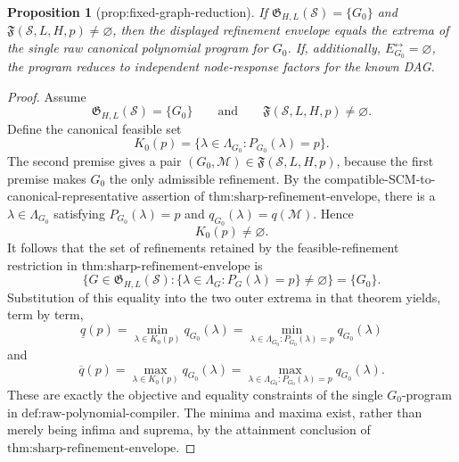 \documentclass{article}
\newtheorem{proposition}{Proposition}
\begin{document}
\begin{proposition}[prop:fixed-graph-reduction]\label{prop:fixed-graph-reduction}
If \(\mathfrak G_{H,L}(\mathcal S)=\{G_0\}\) and \(\mathfrak F(\mathcal S,L,H,p)\ne\varnothing\), then the displayed refinement envelope equals the extrema of the single raw canonical polynomial program for \(G_0\). If, additionally, \(E_{G_0}^{\leftrightarrow}=\varnothing\), the program reduces to independent node-response factors for the known DAG.
\end{proposition}
\begin{proof}
Assume
\[
\mathfrak G_{H,L}(\mathcal S)=\{G_0\}
\qquad\text{and}\qquad
\mathfrak F(\mathcal S,L,H,p)\ne\varnothing.
\]
Define the canonical feasible set
\[
K_0(p)=\{\lambda\in\Lambda_{G_0}:P_{G_0}(\lambda)=p\}.
\]
The second premise gives a pair \((G_0,\mathcal M)\in\mathfrak F(\mathcal S,L,H,p)\), because the first premise makes \(G_0\) the only admissible refinement.  By the compatible-SCM-to-canonical-representative assertion of \(\text{thm:sharp-refinement-envelope}\), there is a \(\lambda\in\Lambda_{G_0}\) satisfying \(P_{G_0}(\lambda)=p\) and \(q_{G_0}(\lambda)=q(\mathcal M)\).  Hence
\[
K_0(p)\ne\varnothing.
\]
It follows that the set of refinements retained by the feasible-refinement restriction in \(\text{thm:sharp-refinement-envelope}\) is
\[
\bigl\{G\in\mathfrak G_{H,L}(\mathcal S):
\{\lambda\in\Lambda_G:P_G(\lambda)=p\}\ne\varnothing\bigr\}
=\{G_0\}.
\]
Substitution of this equality into the two outer extrema in that theorem yields, term by term,
\[
\underline q(p)
=\min_{\lambda\in K_0(p)}q_{G_0}(\lambda)
=\min_{\lambda\in\Lambda_{G_0}:P_{G_0}(\lambda)=p}q_{G_0}(\lambda)
\]
and
\[
\overline q(p)
=\max_{\lambda\in K_0(p)}q_{G_0}(\lambda)
=\max_{\lambda\in\Lambda_{G_0}:P_{G_0}(\lambda)=p}q_{G_0}(\lambda).
\]
These are exactly the objective and equality constraints of the single \(G_0\)-program in \(\text{def:raw-polynomial-compiler}\).  The minima and maxima exist, rather than merely being infima and suprema, by the attainment conclusion of \(\text{thm:sharp-refinement-envelope}\).


\end{proof}
\end{document}
